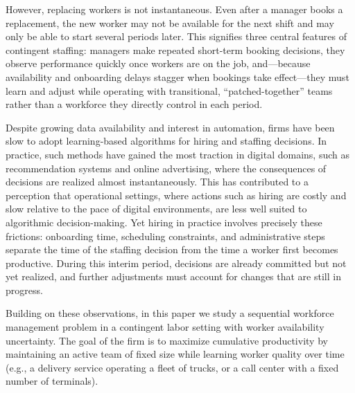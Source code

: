 \documentclass[opre,blindrev]{informs3}
\begin{document}
However, replacing workers is not instantaneous. Even after a manager books a replacement, the new worker may not be available for the next shift and may only be able to start several periods later. %
This signifies three central features of contingent staffing: managers make repeated short-term booking decisions, they observe performance quickly once workers are on the job, and---because availability and onboarding delays stagger when bookings take effect---they must learn and adjust while operating with transitional, ``patched-together'' teams rather than a workforce they directly control in each period.

Despite growing data availability and interest in automation, firms have been slow to adopt learning-based algorithms for hiring and staffing decisions. In practice, such methods have gained the most traction in digital domains, such as recommendation systems and online advertising, where the consequences of decisions are realized almost instantaneously. This has contributed to a perception that operational settings, where actions such as hiring are costly and slow relative to the pace of digital environments, are less well suited to algorithmic decision-making. Yet hiring in practice involves precisely these frictions: onboarding time, scheduling constraints, and administrative steps separate the time of the staffing decision from the time a worker first becomes productive. During this interim period, decisions are already committed but not yet realized, and further adjustments must account for changes that are still in progress.

Building on these observations, in this paper we study a sequential workforce management problem in a contingent labor setting with worker availability uncertainty. The goal of the firm is to maximize cumulative productivity by maintaining an active team of fixed size while learning worker quality over time (e.g., a delivery service operating a fleet of trucks, or a call center with a fixed number of terminals).
\end{document}
